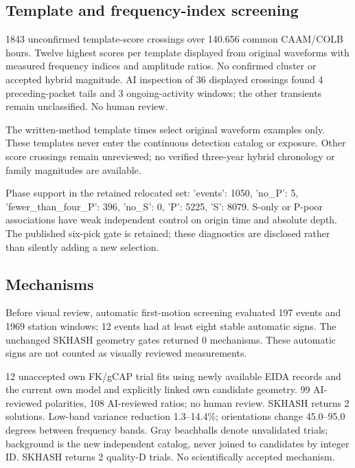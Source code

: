 \subsection*{Template and frequency-index screening}

1843 unconfirmed template-score crossings over 140.656 common CAAM/COLB hours. Twelve highest scores per template displayed from original waveforms with measured frequency indices and amplitude ratios. No confirmed cluster or accepted hybrid magnitude. AI inspection of 36 displayed crossings found 4 preceding-packet tails and 3 ongoing-activity windows; the other transients remain unclassified. No human review.

\par{}\par{}

The written-method template times select original waveform examples only. These templates never enter the continuous detection catalog or exposure. Other score crossings remain unreviewed; no verified three-year hybrid chronology or family magnitudes are available.

Phase support in the retained relocated set: {'events': 1050, 'no\_P': 5, 'fewer\_than\_four\_P': 396, 'no\_S': 0, 'P': 5225, 'S': 8079}. S-only or P-poor associations have weak independent control on origin time and absolute depth. The published six-pick gate is retained; these diagnostics are disclosed rather than silently adding a new selection.

\subsection*{Mechanisms}

Before visual review, automatic first-motion screening evaluated 197 events and 1969 station windows; 12 events had at least eight stable automatic signs. The unchanged SKHASH geometry gates returned 0 mechanisms. These automatic signs are not counted as visually reviewed measurements.

12 unaccepted own FK/gCAP trial fits using newly available EIDA records and the current own model and explicitly linked own candidate geometry. 99 AI-reviewed polarities, 108 AI-reviewed ratios; no human review. SKHASH returns 2 solutions. Low-band variance reduction 1.3--14.4\%; orientations change 45.0--95.0 degrees between frequency bands. Gray beachballs denote unvalidated trials; background is the new independent catalog, never joined to candidates by integer ID. SKHASH returns 2 quality-D trials. No scientifically accepted mechanism.

